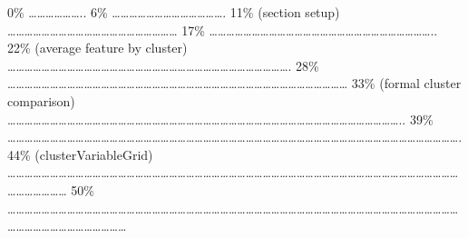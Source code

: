 \documentclass[
]{article}
\begin{document}
\textbar{} \textbar{} \textbar{} 0\% \textbar{}
\textbar\ldots\ldots\ldots\ldots\ldots\ldots.. \textbar{} 6\% \textbar{}
\textbar\ldots\ldots\ldots\ldots\ldots\ldots\ldots\ldots\ldots\ldots\ldots\ldots\ldots.
\textbar{} 11\% (section setup) \textbar{}
\textbar\ldots\ldots\ldots\ldots\ldots\ldots\ldots\ldots\ldots\ldots\ldots\ldots\ldots\ldots\ldots\ldots\ldots\ldots\ldots\ldots{}
\textbar{} 17\% \textbar{}
\textbar\ldots\ldots\ldots\ldots\ldots\ldots\ldots\ldots\ldots\ldots\ldots\ldots\ldots\ldots\ldots\ldots\ldots\ldots\ldots\ldots\ldots\ldots\ldots\ldots\ldots\ldots..
\textbar{} 22\% (average feature by cluster) \textbar{}
\textbar\ldots\ldots\ldots\ldots\ldots\ldots\ldots\ldots\ldots\ldots\ldots\ldots\ldots\ldots\ldots\ldots\ldots\ldots\ldots\ldots\ldots\ldots\ldots\ldots\ldots\ldots\ldots\ldots\ldots\ldots\ldots\ldots\ldots.
\textbar{} 28\% \textbar{}
\textbar\ldots\ldots\ldots\ldots\ldots\ldots\ldots\ldots\ldots\ldots\ldots\ldots\ldots\ldots\ldots\ldots\ldots\ldots\ldots\ldots\ldots\ldots\ldots\ldots\ldots\ldots\ldots\ldots\ldots\ldots\ldots\ldots\ldots\ldots\ldots\ldots\ldots\ldots\ldots\ldots{}
\textbar{} 33\% (formal cluster comparison) \textbar{}
\textbar\ldots\ldots\ldots\ldots\ldots\ldots\ldots\ldots\ldots\ldots\ldots\ldots\ldots\ldots\ldots\ldots\ldots\ldots\ldots\ldots\ldots\ldots\ldots\ldots\ldots\ldots\ldots\ldots\ldots\ldots\ldots\ldots\ldots\ldots\ldots\ldots\ldots\ldots\ldots\ldots\ldots\ldots\ldots\ldots\ldots\ldots..
\textbar{} 39\% \textbar{}
\textbar\ldots\ldots\ldots\ldots\ldots\ldots\ldots\ldots\ldots\ldots\ldots\ldots\ldots\ldots\ldots\ldots\ldots\ldots\ldots\ldots\ldots\ldots\ldots\ldots\ldots\ldots\ldots\ldots\ldots\ldots\ldots\ldots\ldots\ldots\ldots\ldots\ldots\ldots\ldots\ldots\ldots\ldots\ldots\ldots\ldots\ldots\ldots\ldots\ldots\ldots\ldots\ldots\ldots.
\textbar{} 44\% (clusterVariableGrid) \textbar{}
\textbar\ldots\ldots\ldots\ldots\ldots\ldots\ldots\ldots\ldots\ldots\ldots\ldots\ldots\ldots\ldots\ldots\ldots\ldots\ldots\ldots\ldots\ldots\ldots\ldots\ldots\ldots\ldots\ldots\ldots\ldots\ldots\ldots\ldots\ldots\ldots\ldots\ldots\ldots\ldots\ldots\ldots\ldots\ldots\ldots\ldots\ldots\ldots\ldots\ldots\ldots\ldots\ldots\ldots\ldots\ldots\ldots\ldots\ldots\ldots\ldots{}
\textbar{} 50\% \textbar{}
\textbar\ldots\ldots\ldots\ldots\ldots\ldots\ldots\ldots\ldots\ldots\ldots\ldots\ldots\ldots\ldots\ldots\ldots\ldots\ldots\ldots\ldots\ldots\ldots\ldots\ldots\ldots\ldots\ldots\ldots\ldots\ldots\ldots\ldots\ldots\ldots\ldots\ldots\ldots\ldots\ldots\ldots\ldots\ldots\ldots\ldots\ldots\ldots\ldots\ldots\ldots\ldots\ldots\ldots\ldots\ldots\ldots\ldots\ldots\ldots\ldots\ldots\ldots\ldots\ldots\ldots\ldots\ldots{}
\end{document}
